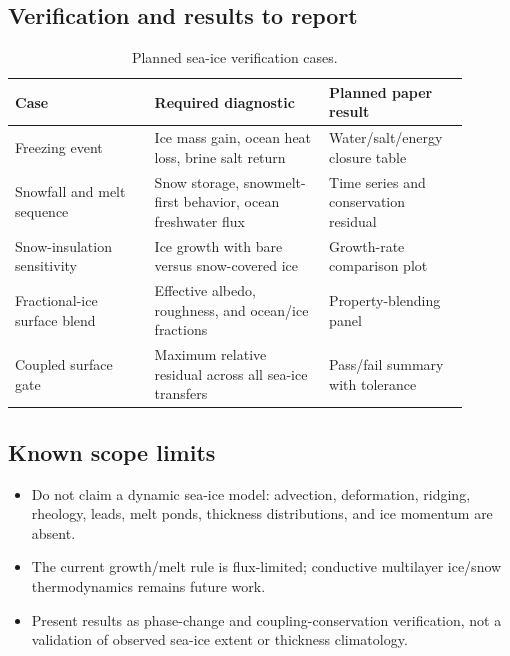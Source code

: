 \subsection{Verification and results to report}
\begin{table}[t]
\centering
\caption{Planned sea-ice verification cases.}
\label{tab:ice-verification}
\begin{tabular}{p{0.28\linewidth}p{0.35\linewidth}p{0.27\linewidth}}
\hline
Case & Required diagnostic & Planned paper result \\
\hline
Freezing event & Ice mass gain, ocean heat loss, brine salt return & Water/salt/energy closure table \\
Snowfall and melt sequence & Snow storage, snowmelt-first behavior, ocean freshwater flux & Time series and conservation residual \\
Snow-insulation sensitivity & Ice growth with bare versus snow-covered ice & Growth-rate comparison plot \\
Fractional-ice surface blend & Effective albedo, roughness, and ocean/ice fractions & Property-blending panel \\
Coupled surface gate & Maximum relative residual across all sea-ice transfers & Pass/fail summary with tolerance \\
\hline
\end{tabular}
\end{table}

\subsection{Known scope limits}
\begin{itemize}
  \item Do not claim a dynamic sea-ice model: advection, deformation, ridging, rheology, leads, melt ponds, thickness distributions, and ice momentum are absent.
  \item The current growth/melt rule is flux-limited; conductive multilayer ice/snow thermodynamics remains future work.
  \item Present results as phase-change and coupling-conservation verification, not a validation of observed sea-ice extent or thickness climatology.
\end{itemize}
